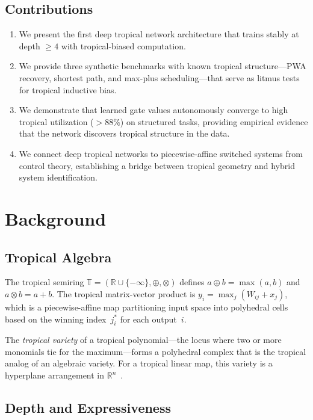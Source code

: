 \documentclass[11pt,twocolumn]{article}
\newcommand{\R}{\mathbb{R}}
\newcommand{\T}{\mathbb{T}}
\newcommand{\tropplus}{\oplus}
\newcommand{\tropmult}{\otimes}
\begin{document}
\subsection{Contributions}

\begin{enumerate}[nosep]
  \item We present the first deep tropical network architecture that trains
    stably at depth $\geq 4$ with tropical-biased computation.
  \item We provide three synthetic benchmarks with known tropical
    structure---PWA recovery, shortest path, and max-plus scheduling---that
    serve as litmus tests for tropical inductive bias.
  \item We demonstrate that learned gate values autonomously converge to high
    tropical utilization ($>88\%$) on structured tasks, providing empirical
    evidence that the network discovers tropical structure in the data.
  \item We connect deep tropical networks to piecewise-affine switched systems
    from control theory, establishing a bridge between tropical geometry and
    hybrid system identification.
\end{enumerate}

\section{Background}\label{sec:background}

\subsection{Tropical Algebra}

The tropical semiring $\T = (\R \cup \{-\infty\}, \tropplus, \tropmult)$
defines $a \tropplus b = \max(a,b)$ and $a \tropmult b = a + b$. The
tropical matrix-vector product is
$y_i = \max_j(W_{ij} + x_j)$,
which is a piecewise-affine map partitioning input space into polyhedral
cells based on the winning index~$j^*_i$ for each output~$i$.

The \emph{tropical variety} of a tropical polynomial---the locus where two
or more monomials tie for the maximum---forms a polyhedral complex that is
the tropical analog of an algebraic variety. For a tropical linear map, this
variety is a hyperplane arrangement in $\R^n$~\cite{maclagan2015introduction}.

\subsection{Depth and Expressiveness}
\end{document}
